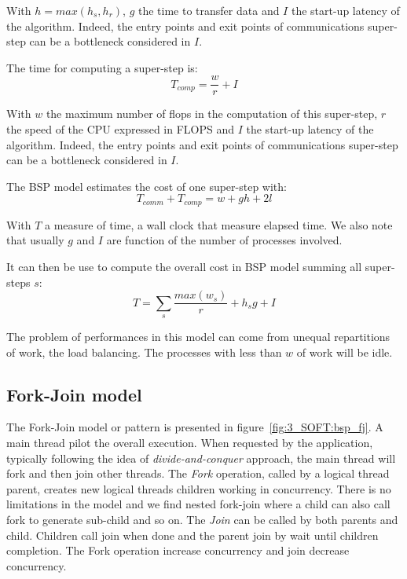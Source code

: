 With $h = max(h_s,h_r)$, $g$ the time to transfer data and $I$ the start-up latency of the algorithm.
Indeed, the entry points and exit points of communications super-step can be a bottleneck considered in $I$.

The time for computing a super-step is: 
\begin{equation}
  T_{comp} = \frac{w}{r} + I
\end{equation}

With $w$ the maximum number of flops in the computation of this super-step, $r$ the speed of the CPU expressed in FLOPS and $I$ the start-up latency of the algorithm.
Indeed, the entry points and exit points of communications super-step can be a bottleneck considered in $I$.


The BSP model estimates the cost of one super-step with: 
\begin{equation}
  T_{comm} + T_{comp} = w + gh + 2l
\end{equation}

With $T$ a measure of time, a wall clock that measure elapsed time. 
We also note that usually $g$ and $I$ are function of the number of processes involved. 

It can then be use to compute the overall cost in BSP model summing all super-steps $s$: 
\begin{equation}
T = \sum_s \frac{max (w_s)}{r} + h_sg + I
\end{equation}

The problem of performances in this model can come from unequal repartitions of work, the load balancing. 
The processes with less than $w$ of work will be idle. 

\subsection{Fork-Join model}
The Fork-Join model or pattern is presented in figure~\ref{fig:3_SOFT:bsp_fj}.
A main thread pilot the overall execution. 
When requested by the application, typically following the idea of \textit{divide-and-conquer} approach, the main thread will fork and then join other threads. 
The \textit{Fork} operation, called by a logical thread parent, creates new logical threads children working in concurrency.
There is no limitations in the model and we find nested fork-join where a child can also call fork to generate sub-child and so on. 
The \textit{Join} can be called by both parents and child. Children call join when done and the parent join by wait until children completion.
The Fork operation increase concurrency and join decrease concurrency.

